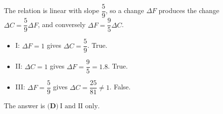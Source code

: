 The relation is linear with slope $\dfrac{5}{9}$, so a change $\Delta F$ produces the change $\Delta C=\dfrac{5}{9}\Delta F$, and conversely $\Delta F=\dfrac{9}{5}\Delta C$.
\begin{itemize}
\item I: $\Delta F=1$ gives $\Delta C=\dfrac{5}{9}$. True.
\item II: $\Delta C=1$ gives $\Delta F=\dfrac{9}{5}=1.8$. True.
\item III: $\Delta F=\dfrac{5}{9}$ gives $\Delta C=\dfrac{25}{81}\ne1$. False.
\end{itemize}
The answer is $\boxed{\textbf{(D)}\ \text{I and II only}}$.
